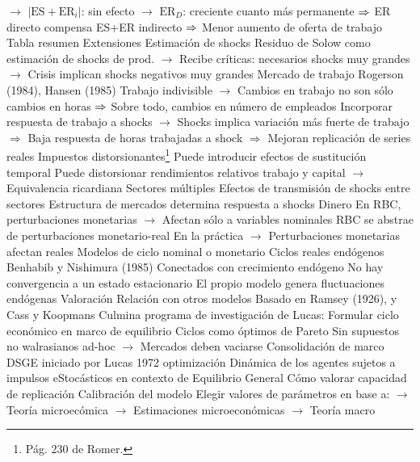 \documentclass{nuevotema}
\begin{document}
\begin{esquemal}
				\4[] $\to$ $\left| \text{ES} + \text{ER}_i\right|$: sin efecto
				\4[] $\to$ $\text{ER}_D$: creciente cuanto más permanente
				\4[] $\Rightarrow$ ER directo compensa ES+ER indirecto
				\4[] $\Rightarrow$ Menor aumento de oferta de trabajo
				\4 Tabla resumen
				\4[] 
		\2 Extensiones
			\3 Estimación de shocks
				\4 Residuo de Solow como estimación de shocks de prod.
				\4[] $\to$ Recibe críticas: necesarios shocks muy grandes
				\4[] $\to$ Crisis implican shocks negativos muy grandes
			\3 Mercado de trabajo
				\4 Rogerson (1984), Hansen (1985)
				\4 Trabajo indivisible
				\4[] $\to$ Cambios en trabajo no son sólo cambios en horas
				\4[] $\Rightarrow$ Sobre todo, cambios en número de empleados
				\4 Incorporar respuesta de trabajo a shocks
				\4[] $\to$ Shocks implica variación más fuerte de trabajo
				\4[] $\Rightarrow$ Baja respuesta de horas trabajadas a shock
				\4[] $\Rightarrow$ Mejoran replicación de series reales
			\3 Impuestos distorsionantes\footnote{Pág. 230 de Romer.}
				\4 Puede introducir efectos de sustitución temporal
				\4 Puede distorsionar
				\4[] rendimientos relativos trabajo y capital
				\4[] $\to$ Equivalencia ricardiana
			\3 Sectores múltiples
				\4[] Efectos de transmisión de shocks entre sectores
				\4[] Estructura de mercados determina respuesta a shocks
			\3 Dinero
				\4[] En RBC, perturbaciones monetarias
				\4[] $\to$ Afectan sólo a variables nominales
				\4[] RBC se abstrae de perturbaciones monetario-real
				\4[] En la práctica
				\4[] $\to$ Perturbaciones monetarias afectan reales
				\4[] Modelos de ciclo nominal o monetario
			\3 Ciclos reales endógenos
				\4[] Benhabib y Nishimura (1985)
				\4[] Conectados con crecimiento endógeno
				\4[] No hay convergencia a un estado estacionario
				\4[] El propio modelo genera fluctuaciones endógenas
		\2 Valoración
			\3 Relación con otros modelos
				\4 Basado en Ramsey (1926), y Cass y Koopmans
				\4 Culmina programa de investigación de Lucas:
				\4[] Formular ciclo económico en marco de equilibrio
				\4[] Ciclos como óptimos de Pareto
				\4[] Sin supuestos no walrasianos ad-hoc
				\4[] $\to$ Mercados deben vaciarse
				\4 Consolidación de marco DSGE
				\4[] iniciado por Lucas 1972
				\4[] optimización Dinámica de los agentes
				\4[] sujetos a impulsos eStocásticos
				\4[] en contexto de Equilibrio General
			\3 Cómo valorar capacidad de replicación
				\4[1] Calibración del modelo
				\4[] Elegir valores de parámetros en base a:
				\4[] $\to$ Teoría microecómica
				\4[] $\to$ Estimaciones microeconómicas
				\4[] $\to$ Teoría macro

\end{esquemal}
\end{document}

